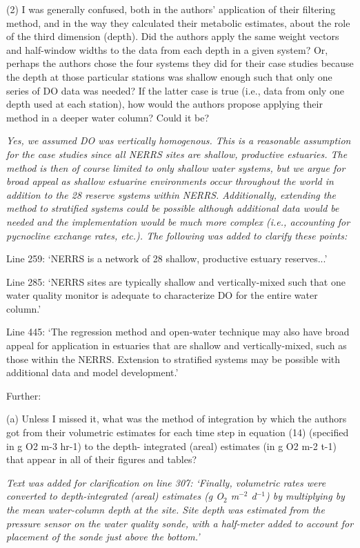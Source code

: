 \documentclass[letterpaper,12pt]{article}\usepackage[]{graphicx}\usepackage[]{color}
\begin{document}
(2) I was generally confused, both in the authors’ application of their filtering method, and in the way they calculated their metabolic estimates, about the role of the third dimension (depth). Did the authors apply the same weight vectors and half-window widths to the data from each depth in a given system? Or, perhaps the authors chose the four systems they did for their case studies because the depth at those particular stations was shallow enough such that only one series of DO data was needed? If the latter case is true (i.e., data from only one depth used at each station), how would the authors propose applying their method in a deeper water column? Could it be? 

{\it Yes, we assumed DO was vertically homogenous. This is a reasonable assumption for the case studies since all NERRS sites are shallow, productive estuaries. The method is then of course limited to only shallow water systems, but we argue for broad appeal as shallow estuarine environments occur throughout the world in addition to the 28 reserve systems within NERRS. Additionally, extending the method to stratified systems could be possible although additional data would be needed and the implementation would be much more complex (i.e., accounting for pycnocline exchange rates, etc.). The following was added to clarify these points:

Line 259: `NERRS is a network of 28 shallow, productive estuary reserves...'

Line 285: `NERRS sites are typically shallow and vertically-mixed such that one water quality monitor is adequate to characterize DO for the entire water column.'

Line 445: `The regression method and open-water technique may also have broad appeal for application in estuaries that are shallow and vertically-mixed, such as those within the NERRS. Extension to stratified systems may be possible with additional data and model development.'   
}

Further:

(a) Unless I missed it, what was the method of integration by which the authors got from their volumetric estimates for each time step in equation (14) (specified in g O2 m-3 hr-1) to the depth- integrated (areal) estimates (in g O2 m-2 t-1) that appear in all of their figures and tables?

{\it Text was added for clarification on line 307: `Finally, volumetric rates were converted to depth-integrated (areal) estimates (g O$_2$ m$^{-2}$ d$^{-1}$) by multiplying by the mean water-column depth at the site. Site depth was estimated from the pressure sensor on the water quality sonde, with a half-meter added to account for placement of the sonde just above the bottom.' 
}
\end{document}
